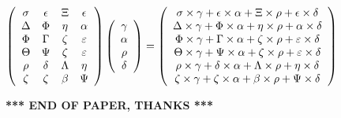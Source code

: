 \documentclass[12pt]{article}
\begin{document}
$  %
 \left( \begin{array}
 {
 c
 c
 c
 c
 }
 \sigma & 
 \epsilon & 
                    \Xi & 
 \epsilon \\ 
 \Delta & 
 \Phi & 
 \eta & 
 \alpha \\ 
 \Phi & 
 \Gamma & 
                    \zeta & 
 \varepsilon \\ 
 \Theta & 
 \Psi & 
                    \zeta & 
 \varepsilon \\ 
 \rho & 
 \delta & 
 \Lambda & 
 \eta \\ 
                    \zeta & 
                    \zeta & 
 \beta & 
 \Psi
 \end{array} \right)
 \left( \begin{array}
 {
 c
 }
 \gamma \\ 
 \alpha \\ 
 \rho \\ 
 \delta
 \end{array} \right)
=
 \left( \begin{array}
 {
 c
 }
  \sigma \times  \gamma +  \epsilon \times  \alpha +                     \Xi \times  \rho +  \epsilon \times  \delta \\ 
  \Delta \times  \gamma +  \Phi \times  \alpha +  \eta \times  \rho +  \alpha \times  \delta \\ 
  \Phi \times  \gamma +  \Gamma \times  \alpha +                     \zeta \times  \rho +  \varepsilon \times  \delta \\ 
  \Theta \times  \gamma +  \Psi \times  \alpha +                     \zeta \times  \rho +  \varepsilon \times  \delta \\ 
  \rho \times  \gamma +  \delta \times  \alpha +  \Lambda \times  \rho +  \eta \times  \delta \\ 
                     \zeta \times  \gamma +                     \zeta \times  \alpha +  \beta \times  \rho +  \Psi \times  \delta
 \end{array} \right)
$
 
 
 
 
 
\noindent{}

 
 
   
   
 \vspace{0.2in}
 
   
   
   
   
\vspace{1.0in} 
{\textbf{\large{ *** END OF PAPER, THANKS *** }}} 
   
\end{document}
